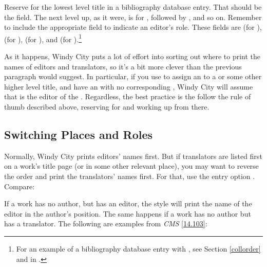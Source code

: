 \documentclass[11pt,letterpaper,oneside]{article}
\begin{document}
Reserve  for the lowest level title in a bibliography
database entry. That should be the  field. The next
level up, as it were, is for , followed by
, and so on. Remember to include the appropriate
 field to indicate an editor's role. These fields are
 (for ),
 (for ),
 (for ), and
 (for ).\footnote{For an
example of a bibliography database entry with , see
Section \ref{collorder} and  in
.}

As it happens, Windy City puts a lot of effort into sorting out where
to print the names of editors and translators, so it's a bit more
clever than the previous paragraph would suggest. In particular, if
you use  to assign an  to a
 or some other higher level title, and have an
 with no corresponding , Windy
City will assume that  is the editor of the
. Regardless, the best practice is the follow the rule
of thumb described above, reserving  for
 and working up from there.

\subsection{Switching Places and Roles}
\label{edtranspos}

Normally, Windy City prints editors' names first. But if translators
are listed first on a work's title page (or in some other relevant
place), you may want to reverse the order and print the translators'
names first. For that, use the entry option . Compare:

\begin{citebib}
\item \cite{doe2010a}
\item \cite{doe2010b}
\end{citebib}

If a work has no author, but has an editor, the style will print the
name of the editor in the author's position. The same happens if a
work has no author but has a translator. The following are examples
from \textit{CMS} \ref{14.103}:

\begin{citebib}
\item \cite[100]{egan2014}
\item \cite[34]{silverstein1974}
\end{citebib}
\end{document}
